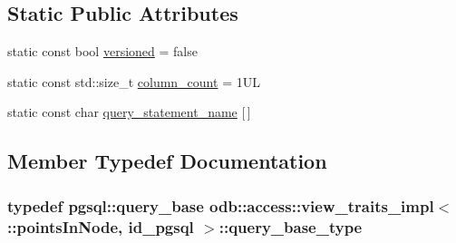 \subsection*{Static Public Attributes}
\begin{DoxyCompactItemize}
\item 
static const bool \hyperlink{classodb_1_1access_1_1view__traits__impl_3_01_1_1points_in_node_00_01id__pgsql_01_4_acc62ebf7f8b1bd4486f7bff43c84b655}{versioned} = false
\item 
static const std\+::size\+\_\+t \hyperlink{classodb_1_1access_1_1view__traits__impl_3_01_1_1points_in_node_00_01id__pgsql_01_4_af41e61cfd9c13d625a546762035ea806}{column\+\_\+count} = 1\+U\+L
\item 
static const char \hyperlink{classodb_1_1access_1_1view__traits__impl_3_01_1_1points_in_node_00_01id__pgsql_01_4_aa5db520afb8385f968d9c1c806dd5d4c}{query\+\_\+statement\+\_\+name} \mbox{[}$\,$\mbox{]}
\end{DoxyCompactItemize}


\subsection{Member Typedef Documentation}
\hypertarget{classodb_1_1access_1_1view__traits__impl_3_01_1_1points_in_node_00_01id__pgsql_01_4_a7f72312a936fa734ce3ed7e7102df78f}{}
\subsubsection[{query\+\_\+base\+\_\+type}]{\setlength{\rightskip}{0pt plus 5cm}typedef pgsql\+::query\+\_\+base odb\+::access\+::view\+\_\+traits\+\_\+impl$<$ \+::{\bf points\+In\+Node}, id\+\_\+pgsql $>$\+::{\bf query\+\_\+base\+\_\+type}}\label{classodb_1_1access_1_1view__traits__impl_3_01_1_1points_in_node_00_01id__pgsql_01_4_a7f72312a936fa734ce3ed7e7102df78f}
\hypertarget{classodb_1_1access_1_1view__traits__impl_3_01_1_1points_in_node_00_01id__pgsql_01_4_ab724377b3a60bdaca252110d3b00c989}{}

